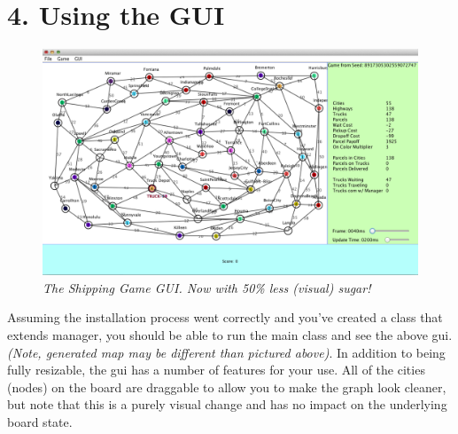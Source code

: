 \documentclass[11pt]{article}
\begin{document}
\section{4. Using the GUI}
\begin{figure}[h]
\centerline{\includegraphics[scale=0.45]{gui.png}} 
\caption{\em{The Shipping Game GUI. Now with 50\% less (visual) sugar!}}
\end{figure}

Assuming the installation process went correctly and you've created a class that extends manager, you should be able to run the main class and see the above gui. {\em(Note, generated map may be different than pictured above)}. In addition to being fully resizable, the gui has a number of features for your use. All of the cities (nodes) on the board are draggable to allow you to make the graph look cleaner, but note that this is a purely visual change and has no impact on the underlying board state.
\end{document}
